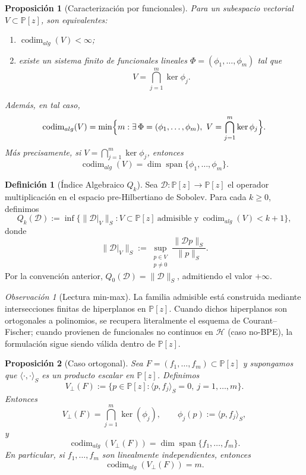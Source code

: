 \documentclass[12pt,a4paper]{article}
\newtheorem{proposition}{Proposición}
\theoremstyle{definition}
\newtheorem{definition}{Definición}
\theoremstyle{remark}
\newtheorem{remark}{Observación}
\begin{document}
\begin{proposition}[Caracterización por funcionales]\label{prop:finite-codim-kernels}
	Para un subespacio vectorial $V\subset \mathbb P[z]$, son equivalentes:
	\begin{enumerate}
		\item $\operatorname{codim}_{alg}(V)<\infty$;
		\item existe un sistema finito de funcionales lineales $\Phi=(\phi_1,\dots,\phi_m)$
		      tal que
		      \[
			      V=\bigcap_{j=1}^m \ker \phi_j.
		      \]
	\end{enumerate}
	Además, en tal caso,
	\[
		\operatorname{codim}_{alg}(V)
		=
		\min\Bigl\{m:\exists\,\Phi=(\phi_1,\dots,\phi_m),\
		V=\bigcap_{j=1}^m\ker\phi_j\Bigr\}.
	\]
	Más precisamente, si $V=\bigcap_{j=1}^m\ker\phi_j$, entonces
	\[
		\operatorname{codim}_{alg}(V)=\dim\operatorname{span}\{\phi_1,\dots,\phi_m\}.
	\]
\end{proposition}

\begin{definition}[Índice Algebraico $Q_k$]\label{def:indice_Qk}
	Sea $\mathcal{D}:\mathbb{P}[z]\to\mathbb{P}[z]$ el operador multiplicación en el espacio pre-Hilbertiano de Sobolev. Para cada $k\ge0$, definimos
	\[
		Q_k(\mathcal{D})
		:=\inf\{\|\mathcal{D}|_V\|_S:V\subset\mathbb{P}[z]\ \text{admisible y}\ \operatorname{codim}_{alg}(V)<k+1\},
	\]
	donde
	\[
		\|\mathcal{D}|_V\|_S:=\sup_{\substack{p\in V\\p\ne0}}\frac{\|\mathcal{D}p\|_S}{\|p\|_S}.
	\]
	Por la convención anterior, $Q_0(\mathcal{D})=\|\mathcal{D}\|_S$, admitiendo el valor $+\infty$.
\end{definition}

\begin{remark}[Lectura min-max]
	La familia admisible está construida mediante intersecciones finitas de hiperplanos en $\mathbb{P}[z]$. Cuando dichos hiperplanos son ortogonales a polinomios, se recupera literalmente el esquema de Courant--Fischer; cuando provienen de funcionales no continuos en $\mathcal{H}$ (caso no-BPE), la formulación sigue siendo válida dentro de $\mathbb{P}[z]$.
\end{remark}

\begin{proposition}[Caso ortogonal]\label{prop:equiv_ortho_interseccion}
	Sea $F=(f_1,\dots,f_m)\subset \mathbb P[z]$ y supongamos que
	$\langle\cdot,\cdot\rangle_S$ es un producto escalar en $\mathbb P[z]$.
	Definimos
	\[
		V_{\perp}(F):=\{p\in\mathbb P[z]:\langle p,f_j\rangle_S=0,\ j=1,\dots,m\}.
	\]
	Entonces
	\[
		V_{\perp}(F)=\bigcap_{j=1}^m \ker(\phi_j),
		\qquad
		\phi_j(p):=\langle p,f_j\rangle_S,
	\]
	y
	\[
		\operatorname{codim}_{alg}(V_\perp(F))
		=
		\dim\operatorname{span}\{f_1,\dots,f_m\}.
	\]
	En particular, si $f_1,\dots,f_m$ son linealmente independientes, entonces
	\[
		\operatorname{codim}_{alg}(V_\perp(F))=m.
	\]
\end{proposition}
\end{document}
